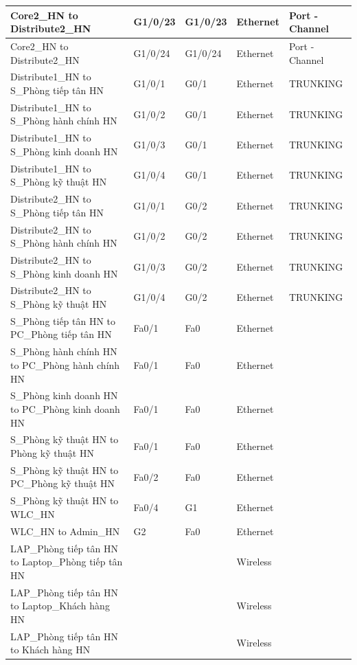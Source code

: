 \documentclass[12pt,a4paper]{report}
\begin{document}
\begin{center}
\begin{longtable}{|p{}|p{}|p{}|p{}|p{}|}
\hline  Core2\_HN  to  Distribute2\_HN  &  G1/0/23  &  G1/0/23  &  Ethernet  &  Port - Channel \\
\hline  Core2\_HN  to  Distribute2\_HN  &  G1/0/24  &  G1/0/24  &  Ethernet  &  Port - Channel \\
\hline  Distribute1\_HN  to  S\_Phòng tiếp tân HN  &  G1/0/1  &  G0/1  &  Ethernet  &  TRUNKING \\
\hline  Distribute1\_HN  to  S\_Phòng hành chính HN  &  G1/0/2  &  G0/1  &  Ethernet  &  TRUNKING \\
\hline  Distribute1\_HN  to  S\_Phòng kinh doanh HN  &  G1/0/3  &  G0/1  &  Ethernet  &  TRUNKING \\
\hline  Distribute1\_HN  to  S\_Phòng kỹ thuật HN  &  G1/0/4  &  G0/1  &  Ethernet  &  TRUNKING \\
\hline  Distribute2\_HN  to  S\_Phòng tiếp tân HN  &  G1/0/1  &  G0/2  &  Ethernet  &  TRUNKING \\
\hline  Distribute2\_HN  to  S\_Phòng hành chính HN  &  G1/0/2  &  G0/2  &  Ethernet  &  TRUNKING \\
\hline  Distribute2\_HN  to  S\_Phòng kinh doanh HN  &  G1/0/3  &  G0/2  &  Ethernet  &  TRUNKING \\
\hline  Distribute2\_HN  to  S\_Phòng kỹ thuật HN  &  G1/0/4  &  G0/2  &  Ethernet  &  TRUNKING \\
\hline  S\_Phòng tiếp tân HN  to  PC\_Phòng tiếp tân HN  &  Fa0/1  &  Fa0  &  Ethernet  &   \\
\hline  S\_Phòng hành chính HN  to  PC\_Phòng hành chính HN  &  Fa0/1  &  Fa0  &  Ethernet  &   \\
\hline  S\_Phòng kinh doanh HN  to  PC\_Phòng kinh doanh HN  &  Fa0/1  &  Fa0  &  Ethernet  &   \\
\hline  S\_Phòng kỹ thuật HN  to  Phòng kỹ thuật HN  &  Fa0/1  &  Fa0  &  Ethernet  &   \\
\hline  S\_Phòng kỹ thuật HN  to  PC\_Phòng kỹ thuật HN  &  Fa0/2  &  Fa0  &  Ethernet  &   \\
\hline  S\_Phòng kỹ thuật HN  to  WLC\_HN  &  Fa0/4  &  G1  &  Ethernet  &   \\
\hline  WLC\_HN  to  Admin\_HN  &  G2  &  Fa0  &  Ethernet  &   \\
\hline  LAP\_Phòng tiếp tân HN  to  Laptop\_Phòng tiếp tân HN  &    &    &  Wireless  &   \\
\hline  LAP\_Phòng tiếp tân HN  to  Laptop\_Khách hàng HN  &    &    &  Wireless  &   \\
\hline  LAP\_Phòng tiếp tân HN  to  Khách hàng HN  &    &    &  Wireless  &   \\

\end{longtable}
\end{center}
\end{document}
